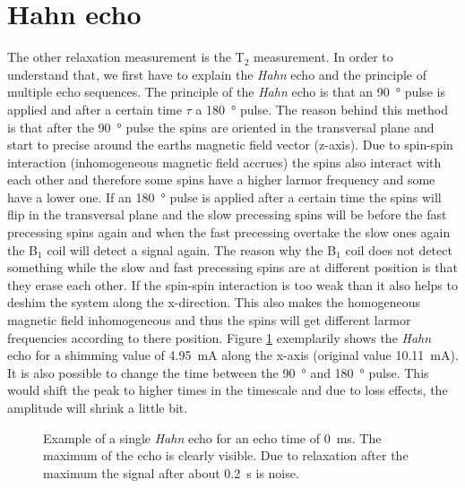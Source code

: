 \section{Hahn echo}
\label{sec:Hahnecho}
The other relaxation measurement is the T$_2$ measurement. In order to understand that, we first have to explain the \textit{Hahn} echo and the principle of multiple echo sequences.\newline
The principle of the \textit{Hahn} echo is that an \SI{90}{\degree} pulse is applied and after a certain time $\tau$ a \SI{180}{\degree} pulse. The reason behind this method is that after the \SI{90}{\degree} pulse the spins are oriented in the transversal plane and start to precise around the earths magnetic field vector (z-axis). Due to spin-spin interaction (inhomogeneous magnetic field accrues) the spins also interact with each other and therefore some spins have a higher larmor frequency and some have a lower one. If an \SI{180}{\degree} pulse is applied after a certain time the spins will flip in the transversal plane and the slow precessing spins will be before the fast precessing spins again and when the fast precessing  overtake the slow ones again the B$_1$ coil will detect a signal again. The reason why the B$_1$ coil does not detect something while the slow and fast precessing spins are at different position is that they erase each other. If the spin-spin interaction is too weak than it also helps to deshim the system along the x-direction. This also makes the homogeneous magnetic field inhomogeneous and thus the spins will get different larmor frequencies according to there position.\newline
Figure \ref{fig:Echobeispeilsignal} exemplarily shows the \textit{Hahn} echo for a shimming value of \SI{4.95}{\milli \ampere} along the x-axis (original value \SI{10.11}{\milli \ampere}). It is also possible to change the time between the \SI{90}{\degree} and \SI{180}{\degree} pulse. This would shift the peak to higher times in the timescale and due to loss effects, the amplitude will shrink a little bit.
\begin{figure}[H]
    \centering
    
    \caption[Example of a single \textit{Hahn} echo for an echo time of \SI{0}{\milli \second}.]{Example of a single \textit{Hahn} echo for an echo time of \SI{0}{\milli \second}. The maximum of the echo is clearly visible. Due to relaxation after the maximum the signal after about \SI{0.2}{\second} is noise.}
    \label{fig:Echobeispeilsignal}
\end{figure}

